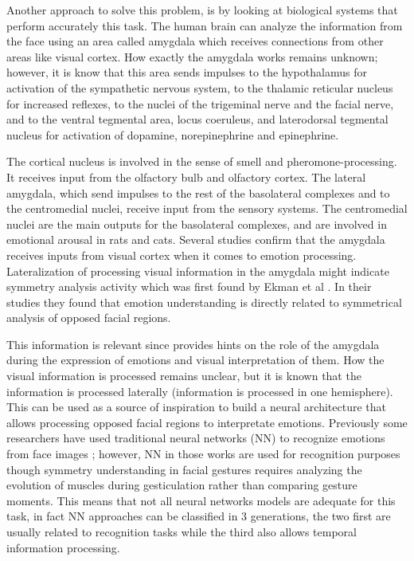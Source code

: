 Another approach to solve this problem, is by looking at biological systems that perform accurately this task. The human brain can analyze the information from the face using an area called amygdala which receives connections from other areas like visual cortex. How exactly the amygdala works remains unknown; however, it is know that this area sends impulses to the hypothalamus for activation of the sympathetic nervous system, to the thalamic reticular nucleus for increased reflexes, to the nuclei of the trigeminal nerve and the facial nerve, and to the ventral tegmental area, locus coeruleus, and laterodorsal tegmental nucleus for activation of dopamine, norepinephrine and epinephrine.%

The cortical nucleus is involved in the sense of smell and pheromone-processing. It receives input from the olfactory bulb and olfactory cortex. The lateral amygdala, which send impulses to the rest of the basolateral complexes and to the centromedial nuclei, receive input from the sensory systems. The centromedial nuclei are the main outputs for the basolateral complexes, and are involved in emotional arousal in rats and cats. Several studies confirm that the amygdala receives inputs from visual cortex when it comes to emotion processing. Lateralization of processing visual information in the amygdala might indicate symmetry analysis activity which was first found by Ekman et al \cite{Hager1979}. In their studies they found that emotion understanding is directly related to symmetrical analysis of opposed facial regions.

This information is relevant since provides hints on the role of the amygdala during the expression of emotions and visual interpretation of them. How the visual information is processed remains unclear, but it is known that the information is processed laterally (information is processed in one hemisphere). This can be used as a source of inspiration to build a neural architecture that allows processing opposed facial regions to interpretate emotions. Previously some researchers have used traditional neural networks (NN) to recognize emotions from face images\cite{Spiros2005}%
; however, NN in those works are used for recognition purposes though symmetry understanding in facial gestures requires analyzing the evolution of muscles during gesticulation rather than comparing gesture moments. This means that not all neural networks models are adequate for this task, in fact NN approaches can be classified in 3 generations, the two first are usually related to recognition tasks while the third also allows temporal information processing.


